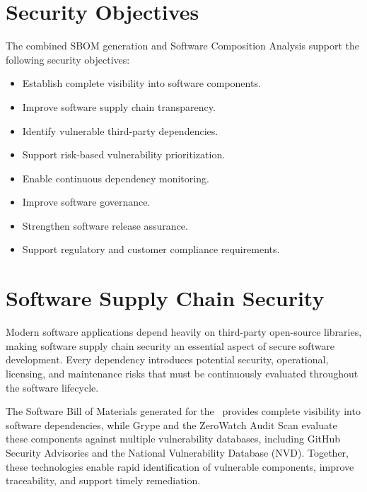 \vspace{0.4cm}


\section{Security Objectives}

The combined SBOM generation and Software Composition Analysis support the following security objectives:
\begin{itemize}
\item Establish complete visibility into software components.
\item Improve software supply chain transparency.
\item Identify vulnerable third-party dependencies.
\item Support risk-based vulnerability prioritization.
\item Enable continuous dependency monitoring.
\item Improve software governance.
\item Strengthen software release assurance.
\item Support regulatory and customer compliance requirements.
\end{itemize}

\vspace{0.4cm}


\section{Software Supply Chain Security}

Modern software applications depend heavily on third-party open-source libraries, making software supply chain security an essential aspect of secure software development. Every dependency introduces potential security, operational, licensing, and maintenance risks that must be continuously evaluated throughout the software lifecycle.

The Software Bill of Materials generated for the \ProjectName\ provides complete visibility into software dependencies, while Grype and the ZeroWatch Audit Scan evaluate these components against multiple vulnerability databases, including GitHub Security Advisories and the National Vulnerability Database (NVD). Together, these technologies enable rapid identification of vulnerable components, improve traceability, and support timely remediation.

